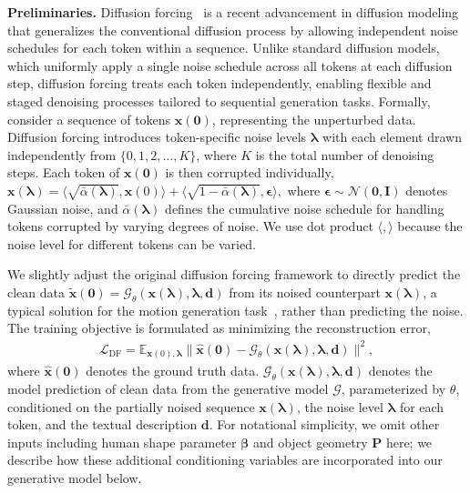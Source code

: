 \noindent \textbf{Preliminaries.} Diffusion forcing~\citep{chen2024diffusion} is a recent advancement in diffusion modeling that generalizes the conventional diffusion process by allowing independent noise schedules for each token within a sequence. Unlike standard diffusion models, which uniformly apply a single noise schedule across all tokens at each diffusion step, diffusion forcing treats each token independently, enabling flexible and staged denoising processes tailored to sequential generation tasks. Formally, consider a sequence of tokens ${\boldsymbol{x}}(\boldsymbol 0)$, representing the unperturbed data. Diffusion forcing introduces token-specific noise levels $\boldsymbol\lambda$ with each element drawn independently from $\{0, 1, 2, \dots, K\}$, where $K$ is the total number of denoising steps. Each token of ${\boldsymbol{x}}(\boldsymbol 0)$ is then corrupted individually,
$
    \boldsymbol{x}(\boldsymbol\lambda) = \langle\sqrt{\bar{\alpha}(\boldsymbol\lambda)},\boldsymbol{x}(0)\rangle + \langle\sqrt{1 - \bar{\alpha}(\boldsymbol\lambda)},\boldsymbol{\epsilon}\rangle,$
where $\boldsymbol{\epsilon} \sim \mathcal{N}(\boldsymbol{0}, \boldsymbol{I})$ denotes Gaussian noise, and $\bar{\alpha}(\boldsymbol\lambda)$ defines the cumulative noise schedule for handling tokens corrupted by varying degrees of noise. We use dot product $\langle,\rangle$ because the noise level for different tokens can be varied.

We slightly adjust the original diffusion forcing framework to directly predict the clean data $\tilde{\boldsymbol{x}}(\boldsymbol0) = \mathcal{G}_\theta(\boldsymbol{x}(\boldsymbol{\lambda}), \boldsymbol\lambda, \boldsymbol d)$ from its noised counterpart $\boldsymbol{x}(\boldsymbol\lambda)$, a typical solution for the motion generation task~\citep{tevet2023human}, rather than predicting the noise. The training objective is formulated as minimizing the reconstruction error,
\begin{align}
\mathcal{L}_{\text{DF}} = \mathbb{E}_{\boldsymbol{x}(0),\boldsymbol{\lambda}} \| \hat{\boldsymbol{x}}(\boldsymbol 0) - \mathcal{G}_\theta(\boldsymbol{x}(\boldsymbol{\lambda}), \boldsymbol\lambda, \boldsymbol d) \|^2,
\end{align}
where $\hat{\boldsymbol{x}}(\boldsymbol 0)$ denotes the ground truth data. $\mathcal{G}_\theta(\boldsymbol{x}(\boldsymbol{\lambda}), \boldsymbol\lambda, \boldsymbol d)$ denotes the model prediction of clean data from the generative model $\mathcal{G}$, parameterized by $\theta$, conditioned on the partially noised sequence $\boldsymbol{x}(\boldsymbol{\lambda})$, the noise level $\boldsymbol\lambda$ for each token, and the textual description $\boldsymbol{d}$. For notational simplicity, we omit other inputs including human shape parameter $\boldsymbol{\beta}$ and object geometry $\boldsymbol{P}$ here; we describe how these additional conditioning variables are incorporated into our generative model below.

